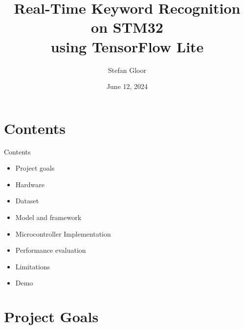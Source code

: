 \documentclass{beamer}
\title{Real-Time Keyword Recognition on STM32\\using TensorFlow Lite}
\institute{ETH Zürich}
\author{Stefan Gloor}
\date{June 12, 2024}
\begin{document}
\begin{frame}
	\titlepage
\end{frame}

\section*{Contents}
\begin{frame}{Contents}
	\begin{itemize}
		\item<2->Project goals
		\item<3->Hardware
		\item<4->Dataset
		\item<5->Model and framework
		\item<6->Microcontroller Implementation
		\item<7->Performance evaluation
		\item<8->Limitations
		\item<9->Demo
	\end{itemize}
\end{frame}

\section{Project Goals}
\end{document}
